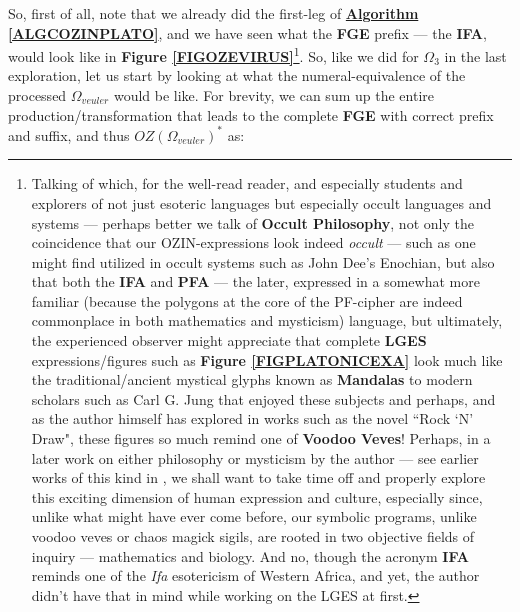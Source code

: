 \documentclass[a4paper, 18pt]{book} %
\begin{document}
So, first of all, note that we already did the first-leg of \textbf{\hyperref[ALGCOZINPLATO]{Algorithm \ref{ALGCOZINPLATO}}}, and we have seen what the \textbf{FGE} prefix --- the \textbf{IFA}, would look like in \textbf{Figure \ref{FIGOZEVIRUS}}\footnote{Talking of which, for the well-read reader, and especially students and explorers of not just esoteric languages but especially occult languages and systems --- perhaps better we talk of \textbf{Occult Philosophy}\cite{agrippa2014occult}, not only the coincidence that our OZIN-expressions look indeed \textit{occult} --- such as one might find utilized in occult systems such as John Dee's Enochian\cite{lutalo2025unraveling}, but also that both the \textbf{IFA} and \textbf{PFA} --- the later, expressed in a somewhat more familiar (because the polygons at the core of the PF-cipher are indeed commonplace in both mathematics and mysticism) language, but ultimately, the experienced observer might appreciate that complete \textbf{LGES} expressions/figures such as \textbf{Figure \ref{FIGPLATONICEXA}} look much like the traditional/ancient mystical glyphs known as \textbf{Mandalas} to modern scholars such as Carl G. Jung that enjoyed these subjects\cite{jung1964symbols} and perhaps, and as the author himself has explored in works such as the novel ``Rock `N' Draw"\cite{lutalo2025rock}, these figures so much remind one of \textbf{Voodoo Veves}! Perhaps, in a later work on either philosophy or mysticism by the author --- see earlier works of this kind in \cite{lutalo2025concerning_trans}, we shall want to take time off and properly explore this exciting dimension of human expression and culture, especially since, unlike what might have ever come before, our symbolic programs, unlike voodoo veves or chaos magick sigils, are rooted in two objective fields of inquiry --- mathematics and biology. And no, though the acronym \textbf{IFA} reminds one of the \textit{Ifa} esotericism of  Western Africa, and yet, the author didn't have that in mind while working on the LGES at first.}. So, like we did for $\Omega_{3}$ in the last exploration, let us start by looking at what the numeral-equivalence of the processed $\Omega_{veuler}$ would be like. For brevity, we can sum up the entire production/transformation that leads to the complete \textbf{FGE} with correct prefix and suffix, and thus $\boxed{OZ(\Omega_{veuler})}^*$ as:
\end{document}

